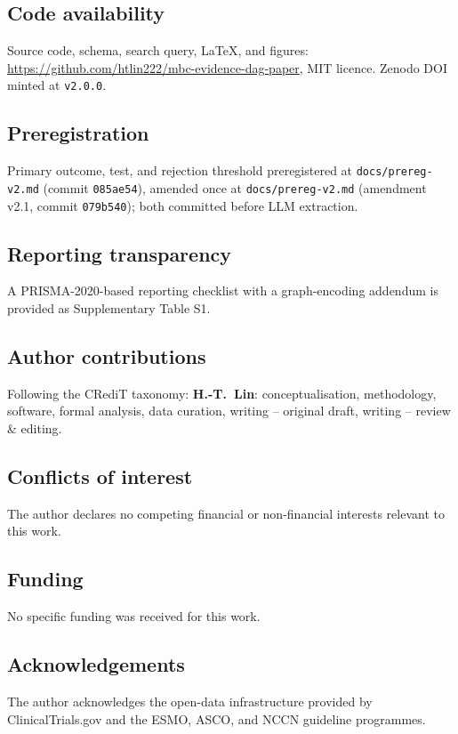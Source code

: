 \documentclass[11pt,a4paper]{article}
\begin{document}
\subsection*{Code availability}
Source code, schema, search query, LaTeX, and figures: \url{https://github.com/htlin222/mbc-evidence-dag-paper}, MIT licence. Zenodo DOI minted at \texttt{v2.0.0}.

\subsection*{Preregistration}
Primary outcome, test, and rejection threshold preregistered at \texttt{docs/prereg-v2.md} (commit \texttt{085ae54}), amended once at \texttt{docs/prereg-v2.md} (amendment v2.1, commit \texttt{079b540}); both committed before LLM extraction.

\subsection*{Reporting transparency}
A PRISMA-2020-based reporting checklist with a graph-encoding addendum is provided as Supplementary Table S1.

\subsection*{Author contributions}
Following the CRediT taxonomy: \textbf{H.-T.\ Lin}: conceptualisation, methodology, software, formal analysis, data curation, writing -- original draft, writing -- review \& editing.

\subsection*{Conflicts of interest}
The author declares no competing financial or non-financial interests relevant to this work.

\subsection*{Funding}
No specific funding was received for this work.

\subsection*{Acknowledgements}
The author acknowledges the open-data infrastructure provided by ClinicalTrials.gov and the ESMO, ASCO, and NCCN guideline programmes.



\end{document}
